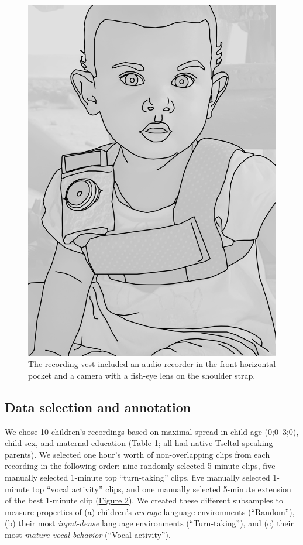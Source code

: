 \documentclass[floatsintext,man]{apa6}
\theoremstyle{definition}
\theoremstyle{definition}
\theoremstyle{definition}
\theoremstyle{remark}
\begin{document}
\begin{figure}

{\centering \includegraphics[width=0.3\linewidth]{Tseltal-CLE_files/TseltalCLE-RecordingVest} 

}

\caption{The recording vest included an audio recorder in the front horizontal pocket and a camera with a fish-eye lens on the shoulder strap.}\label{fig:fig1}
\end{figure}

\subsection{Data selection and annotation}\label{methods-samples}

We chose 10 children's recordings based on maximal spread in child age
(0;0--3;0), child sex, and maternal education
(\protect\hyperlink{tab1}{Table 1}; all had native Tseltal-speaking
parents). We selected one hour's worth of non-overlapping clips from
each recording in the following order: nine randomly selected 5-minute
clips, five manually selected 1-minute top \enquote{turn-taking} clips,
five manually selected 1-minute top \enquote{vocal activity} clips, and
one manually selected 5-minute extension of the best 1-minute clip
(\protect\hyperlink{fig2}{Figure 2}). We created these different
subsamples to measure properties of (a) children's \emph{average}
language environments (\enquote{Random}), (b) their most
\emph{input-dense} language environments (\enquote{Turn-taking}), and
(c) their most \emph{mature vocal behavior} (\enquote{Vocal activity}).
\end{document}
